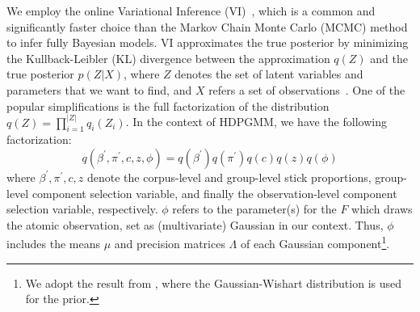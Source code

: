 \documentclass{article}
\begin{document}
We employ the online Variational Inference (VI)~\cite{DBLP:journals/jmlr/WangPB11}, which is a common and significantly faster choice than the Markov Chain Monte Carlo (MCMC) method to infer fully Bayesian models. VI approximates the true posterior by minimizing the Kullback-Leibler (KL) divergence between the approximation $q(Z)$ and the true posterior $p(Z|X)$, where $Z$ denotes the set of latent variables and parameters that we want to find, and $X$ refers a set of observations~\cite{bishop2006pattern}.
One of the popular simplifications is the full factorization of the distribution $q(Z) = \prod^{|Z|}_{i=1} q_{i}(Z_{i})$. In the context of HDPGMM, we have the following factorization:
\begin{equation}\label{eq:meanfield_vi_hdpgmm}
    q(\beta^{\prime}, \pi^{\prime}, c, z, \phi) = q(\beta^{\prime})q(\pi^{\prime})q(c)q(z)q(\phi)
\end{equation}
where $\beta^{\prime}, \pi^{\prime}, c, z$ denote the corpus-level and group-level stick proportions, group-level component selection variable, and finally the observation-level component selection variable, respectively. $\phi$ refers to the parameter(s) for the $F$ which draws the atomic observation, set as (multivariate) Gaussian in our context. Thus, $\phi$ includes the means $\mu$ and precision matrices $\Lambda$ of each Gaussian component\footnote{We adopt the result from \cite{bishop2006pattern}, where the Gaussian-Wishart distribution is used for the prior.}.
\end{document}
